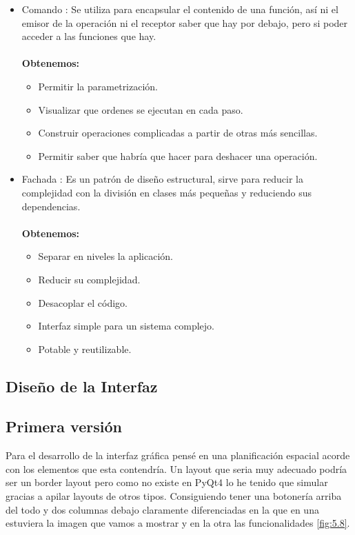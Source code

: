 \begin{itemize}
\item Comando \cite{wiki:Comando}: Se utiliza para encapsular el contenido de una función, así ni el emisor de la operación ni el receptor saber que hay por debajo, pero si poder acceder a las funciones que hay.\\\\
\textbf{Obtenemos:}
\begin{itemize}
\item Permitir la parametrización.
\item Visualizar que ordenes se ejecutan en cada paso.
\item Construir operaciones complicadas a partir de otras más sencillas.
\item Permitir saber que habría que hacer para deshacer una operación.
\end{itemize}
\item Fachada \cite{wiki:Fachada}: Es un patrón de diseño estructural, sirve para reducir la complejidad con la división en clases más pequeñas y reduciendo sus dependencias.\\\\
\textbf{Obtenemos:}
\begin{itemize}
\item Separar en niveles la aplicación.
\item Reducir su complejidad.
\item Desacoplar el código.
\item Interfaz simple para un sistema complejo.
\item Potable y reutilizable.
\end{itemize}
\end{itemize}


\subsection{Diseño de la Interfaz}

\subsection{Primera versión}

Para el desarrollo de la interfaz gráfica pensé en una planificación espacial acorde con los elementos que esta contendría.
Un layout que seria muy adecuado podría ser un border layout pero como no existe en PyQt4 lo he tenido que simular gracias a apilar layouts de otros tipos.
Consiguiendo tener una botonería arriba del todo y dos columnas debajo claramente diferenciadas en la que en una estuviera la imagen que vamos a mostrar y en la otra las funcionalidades \ref{fig:5.8}.

